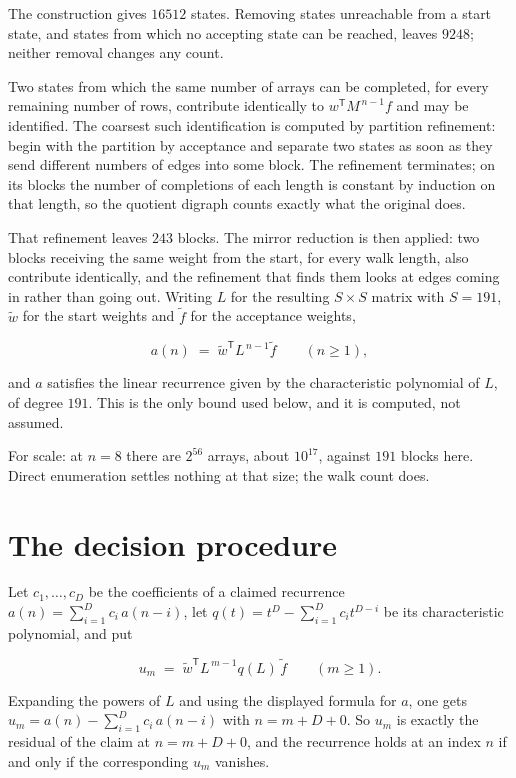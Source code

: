 \documentclass[11pt]{article}
\theoremstyle{definition}
\begin{document}
The construction gives $16512$ states. Removing states unreachable from a start state, and states from which no accepting state can be reached, leaves $9248$; neither removal changes any count.

Two states from which the same number of arrays can be completed, for every remaining number of rows, contribute identically to $w^{\mathsf T}M^{\,n-1}f$ and may be identified. The coarsest such identification is computed by partition refinement: begin with the partition by acceptance and separate two states as soon as they send different numbers of edges into some block. The refinement terminates; on its blocks the number of completions of each length is constant by induction on that length, so the quotient digraph counts exactly what the original does.

That refinement leaves $243$ blocks. The mirror reduction is then applied: two blocks receiving the same weight from the start, for every walk length, also contribute identically, and the refinement that finds them looks at edges coming in rather than going out. Writing $L$ for the resulting $S \times S$ matrix with $S = 191$, $\tilde w$ for the start weights and $\tilde f$ for the acceptance weights,

\[a(n) \;=\; \tilde w^{\mathsf T} L^{\,n-1} \tilde f \qquad (n \ge 1),\]

and $a$ satisfies the linear recurrence given by the characteristic polynomial of $L$, of degree $191$. This is the only bound used below, and it is computed, not assumed.

For scale: at $n = 8$ there are $2^{56}$ arrays, about $10^{17}$, against $191$ blocks here. Direct enumeration settles nothing at that size; the walk count does.

\section{The decision procedure}

Let $c_1,\dots,c_D$ be the coefficients of a claimed recurrence $a(n) = \sum_{i=1}^{D} c_i\,a(n-i)$, let $q(t) = t^{D} - \sum_{i=1}^{D} c_i t^{D-i}$ be its characteristic polynomial, and put

\[u_m \;=\; \tilde w^{\mathsf T} L^{\,m-1} q(L)\,\tilde f \qquad (m \ge 1).\]

Expanding the powers of $L$ and using the displayed formula for $a$, one gets $u_m = a(n) - \sum_{i=1}^{D} c_i\,a(n-i)$ with $n = m + D + 0$. So $u_m$ is exactly the residual of the claim at $n = m + D + 0$, and the recurrence holds at an index $n$ if and only if the corresponding $u_m$ vanishes.
\end{document}
